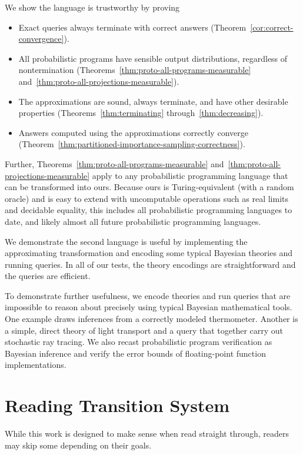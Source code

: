 We show the language is trustworthy by proving
\begin{itemize}
	\item Exact queries always terminate with correct answers (Theorem~\ref{cor:correct-convergence}).
	\item All probabilistic programs have sensible output distributions, regardless of nontermination (Theorems~\ref{thm:proto-all-programs-measurable} and~\ref{thm:proto-all-projections-measurable}).
	\item The approximations are sound, always terminate, and have other desirable properties (Theorems~\ref{thm:terminating} through~\ref{thm:decreasing}).
	\item Answers computed using the approximations correctly converge (Theorem~\ref{thm:partitioned-importance-sampling-correctness}).
\end{itemize}
Further, Theorems~\ref{thm:proto-all-programs-measurable} and~\ref{thm:proto-all-projections-measurable} apply to any probabilistic programming language that can be transformed into ours.
Because ours is Turing-equivalent (with a random oracle) and is easy to extend with uncomputable operations such as real limits and decidable equality, this includes all probabilistic programming languages to date, and likely almost all future probabilistic programming languages.

We demonstrate the second language is useful by implementing the approximating transformation and encoding some typical Bayesian theories and running queries.
In all of our tests, the theory encodings are straightforward and the queries are efficient.

To demonstrate further usefulness, we encode theories and run queries that are impossible to reason about precisely using typical Bayesian mathematical tools.
One example draws inferences from a correctly modeled thermometer.
Another is a simple, direct theory of light transport and a query that together carry out stochastic ray tracing.
We also recast probabilistic program verification as Bayesian inference and verify the error bounds of floating-point function implementations.

\section{Reading Transition System}

While this work is designed to make sense when read straight through, readers may skip some depending on their goals.

